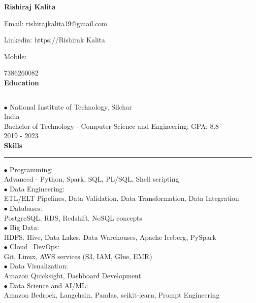 \documentclass[11pt,a4paper]{article}
\renewcommand{\section}[1]{%
  \vspace{12pt}%
  {\large\bfseries #1}%
  \vspace{6pt}%
  \hrule%
  \vspace{6pt}%
}
\begin{document}
\begin{center}\Huge\textbf{Rishiraj Kalita}\\[0.5cm]\end{center}

\begin{center}Email: rishirajkalita19@gmail.com\end{center}
\begin{center}Linkedin: https://Rishirak Kalita\end{center}
\begin{center}Mobile:\end{center}
7386260082\\[0.2cm]
\section{Education}

\noindent $\bullet$ National Institute of Technology, Silchar\\[0.2cm]
India\\[0.2cm]
Bachelor of Technology - Computer Science and Engineering; GPA: 8.8\\[0.2cm]
2019 - 2023\\[0.2cm]
\section{Skills}

\noindent $\bullet$ Programming:\\[0.2cm]
Advanced - Python, Spark, SQL, PL/SQL, Shell scripting\\[0.2cm]
\noindent $\bullet$ Data Engineering:\\[0.2cm]
ETL/ELT Pipelines, Data Validation, Data Transformation, Data Integration\\[0.2cm]
\noindent $\bullet$ Databases:\\[0.2cm]
PostgreSQL, RDS, Redshift, NoSQL concepts\\[0.2cm]
\noindent $\bullet$ Big Data:\\[0.2cm]
HDFS, Hive, Data Lakes, Data Warehouses, Apache Iceberg, PySpark\\[0.2cm]
\noindent $\bullet$ Cloud \ DevOps:\\[0.2cm]
Git, Linux, AWS services (S3, IAM, Glue, EMR)\\[0.2cm]
\noindent $\bullet$ Data Visualization:\\[0.2cm]
Amazon Quicksight, Dashboard Development\\[0.2cm]
\noindent $\bullet$ Data Science and AI/ML:\\[0.2cm]
Amazon Bedrock, Langchain, Pandas, scikit-learn, Prompt Engineering\\[0.2cm]
\end{document}

